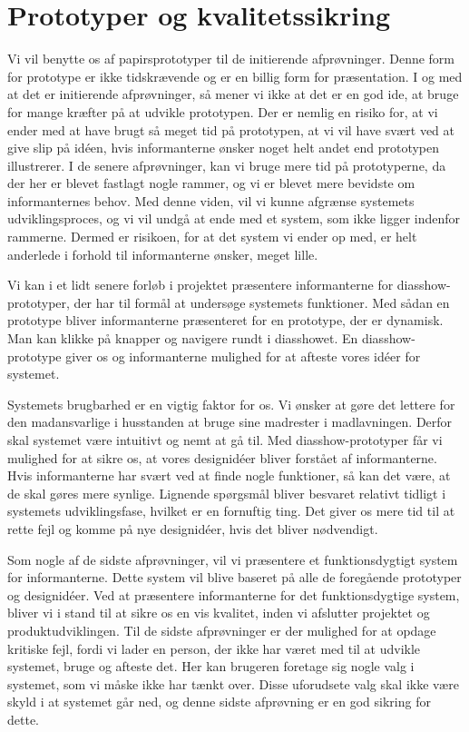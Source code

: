 \section{Prototyper og kvalitetssikring}
Vi vil benytte os af papirsprototyper til de initierende afprøvninger. Denne form for prototype er ikke tidskrævende og er en billig form for præsentation. I og med at det er initierende afprøvninger, så mener vi ikke at det er en god ide, at bruge for mange kræfter på at udvikle prototypen. Der er nemlig en risiko for, at vi ender med at have brugt så meget tid på prototypen, at vi vil have svært ved at give slip på idéen, hvis informanterne ønsker noget helt andet end prototypen illustrerer. I de senere afprøvninger, kan vi bruge mere tid på prototyperne, da der her er blevet fastlagt nogle rammer, og vi er blevet mere bevidste om informanternes behov. Med denne viden, vil vi kunne afgrænse systemets udviklingsproces, og vi vil undgå at ende med et system, som ikke ligger indenfor rammerne. Dermed er risikoen, for at det system vi ender op med, er helt anderlede i forhold til informanterne ønsker, meget lille.

Vi kan i et lidt senere forløb i projektet præsentere informanterne for diasshow-prototyper, der har til formål at undersøge systemets funktioner. Med sådan en prototype bliver informanterne præsenteret for en prototype, der er dynamisk. Man kan klikke på knapper og navigere rundt i diasshowet. En diasshow-prototype giver os og informanterne mulighed for at afteste vores idéer for systemet. 

Systemets brugbarhed er en vigtig faktor for os. Vi ønsker at gøre det lettere for den madansvarlige i husstanden at bruge sine madrester i madlavningen. Derfor skal systemet være intuitivt og nemt at gå til. Med diasshow-prototyper får vi mulighed for at sikre os, at vores designidéer bliver forstået af informanterne. Hvis informanterne \fx har svært ved at finde nogle funktioner, så kan det være, at de skal gøres mere synlige. Lignende spørgsmål bliver besvaret relativt tidligt i systemets udviklingsfase, hvilket er en fornuftig ting. Det giver os mere tid til at rette fejl og komme på nye designidéer, hvis det bliver nødvendigt.

Som nogle af de sidste afprøvninger, vil vi præsentere et funktionsdygtigt system for informanterne. Dette system vil blive baseret på alle de foregående prototyper og designidéer. Ved at præsentere informanterne for det funktionsdygtige system, bliver vi i stand til at sikre os en vis kvalitet, inden vi afslutter projektet og produktudviklingen. Til de sidste afprøvninger er der mulighed for at opdage kritiske fejl, fordi vi lader en person, der ikke har været med til at udvikle systemet, bruge og afteste det. Her kan brugeren foretage sig nogle valg i systemet, som vi måske ikke har tænkt over. Disse uforudsete valg skal ikke være skyld i at systemet går ned, og denne sidste afprøvning er en god sikring for dette. 